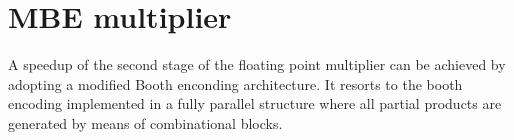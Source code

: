 \chapter{MBE multiplier}
A speedup of the second stage of the floating point multiplier can be achieved by adopting a modified Booth enconding architecture. It resorts to the booth encoding implemented in a fully parallel structure where all partial products are generated by means of combinational blocks.



